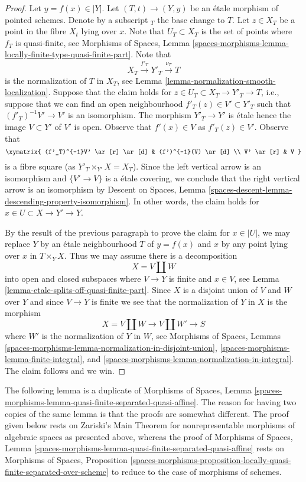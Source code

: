 \begin{proof}
\medskip\noindent
Let $y = f(x) \in |Y|$. Let $(T, t) \to (Y, y)$ be an \'etale morphism
of pointed schemes. Denote by a subscript ${}_T$ the base change to $T$.
Let $z \in X_T$ be a point in the fibre $X_t$ lying over $x$.
Note that $U_T \subset X_T$ is the set of points where $f_T$ is
quasi-finite, see Morphisms of Spaces, Lemma
\ref{spaces-morphisms-lemma-locally-finite-type-quasi-finite-part}.
Note that
$$
X_T \xrightarrow{f'_T} Y'_T \xrightarrow{\nu_T} T
$$
is the normalization of $T$ in $X_T$, see
Lemma \ref{lemma-normalization-smooth-localization}.
Suppose that the claim holds for $z \in U_T \subset X_T \to Y'_T \to T$, i.e.,
suppose that we can find an open neighbourhood
$f'_T(z) \in V' \subset Y'_T$ such that $(f'_T)^{-1}V' \to V'$ is an
isomorphism. The morphism $Y'_T \to Y'$ is \'etale hence the image
$V \subset Y'$ of $V'$ is open. Observe that $f'(x) \in V$ as $f'_T(z) \in V'$.
Observe that
$$
\xymatrix{
(f'_T)^{-1}V' \ar[r] \ar[d] & (f')^{-1}(V) \ar[d] \\
V' \ar[r] & V
}
$$
is a fibre square (as $Y'_T \times_{Y'} X = X_T$).
Since the left vertical arrow is an isomorphism
and $\{V' \to V\}$ is a \'etale covering, we conclude that the right vertical
arrow is an isomorphism by
Descent on Spaces, Lemma
\ref{spaces-descent-lemma-descending-property-isomorphism}.
In other words, the claim holds for $x \in U \subset X \to Y' \to Y$.

\medskip\noindent
By the result of the previous paragraph to prove the claim for
$x \in |U|$, we may replace $Y$ by an \'etale neighbourhood $T$ of
$y = f(x)$ and $x$ by any point lying over $x$ in $T \times_Y X$.
Thus we may assume there is a decomposition
$$
X = V \amalg W
$$
into open and closed subspaces where $V \to Y$ is finite and $x \in V$,
see Lemma \ref{lemma-etale-splits-off-quasi-finite-part}.
Since $X$ is a disjoint union of $V$ and $W$ over $Y$ and since
$V \to Y$ is finite we see that the
normalization of $Y$ in $X$ is the morphism
$$
X = V \amalg W \longrightarrow V \amalg W' \longrightarrow S
$$
where $W'$ is the normalization of $Y$ in $W$, see
Morphisms of Spaces, Lemmas
\ref{spaces-morphisms-lemma-normalization-in-disjoint-union},
\ref{spaces-morphisms-lemma-finite-integral}, and
\ref{spaces-morphisms-lemma-normalization-in-integral}.
The claim follows and we win.
\end{proof}

\noindent
The following lemma is a duplicate of
Morphisms of Spaces, Lemma
\ref{spaces-morphisms-lemma-quasi-finite-separated-quasi-affine}.
The reason for having two copies of the same lemma is that the
proofs are somewhat different. The proof given below
rests on Zariski's Main Theorem for nonrepresentable morphisms of
algebraic spaces as presented above, whereas the proof of
Morphisms of Spaces, Lemma
\ref{spaces-morphisms-lemma-quasi-finite-separated-quasi-affine}
rests on Morphisms of Spaces, Proposition
\ref{spaces-morphisms-proposition-locally-quasi-finite-separated-over-scheme}
to reduce to the case of morphisms of schemes.

